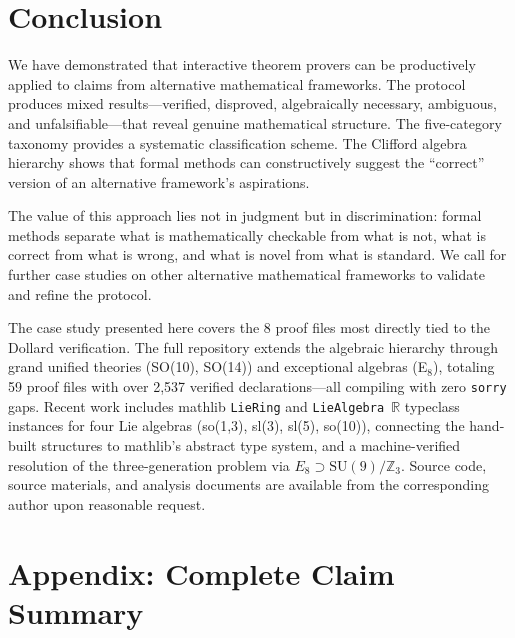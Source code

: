 \documentclass[runningheads]{llncs}
\begin{document}
\section{Conclusion}
\label{sec:conclusion}

We have demonstrated that interactive theorem provers can be productively
applied to claims from alternative mathematical frameworks. The protocol
produces mixed results---verified, disproved, algebraically necessary,
ambiguous, and unfalsifiable---that reveal genuine mathematical structure.
The five-category taxonomy provides a systematic classification scheme.
The Clifford algebra hierarchy shows that formal methods can constructively
suggest the ``correct'' version of an alternative framework's aspirations.

The value of this approach lies not in judgment but in discrimination: formal
methods separate what is mathematically checkable from what is not, what is
correct from what is wrong, and what is novel from what is standard. We call
for further case studies on other alternative mathematical frameworks to
validate and refine the protocol.

The case study presented here covers the 8 proof files most directly tied to
the Dollard verification. The full repository extends the algebraic hierarchy
through grand unified theories (SO(10), SO(14)) and exceptional algebras
(E$_8$), totaling 59 proof files with over 2,537 verified declarations---all
compiling with zero \texttt{sorry} gaps. Recent work includes mathlib
\texttt{LieRing} and \texttt{LieAlgebra~$\mathbb{R}$} typeclass instances for
four Lie algebras (so(1,3), sl(3), sl(5), so(10)), connecting the hand-built
structures to mathlib's abstract type system, and a machine-verified resolution
of the three-generation problem via $E_8 \supset \mathrm{SU}(9)/\mathbb{Z}_3$.
Source code, source materials, and analysis documents are available from
the corresponding author upon reasonable request.

\section*{Appendix: Complete Claim Summary}
\label{sec:appendix}
\end{document}
